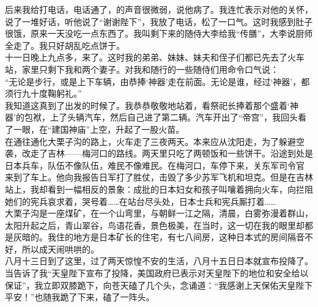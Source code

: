 后来我给打电话，电话通了，的声音很微弱，说他病了。我连忙表示对他的关怀，说了一堆好话，听他说了“谢谢陛下”，我放了电话，松了一口气。这时我感到肚子很饿，原来一天没吃一点东西了。我叫剩下来的随侍大李给我“传膳”，大李说厨师全走了。我只好胡乱吃点饼于。\\

十一日晚上九点多，来了。这时我的弟弟、妹妹、妹夫和侄子们都已先去了火车站，家里只剩下我和两个妻子。对我和随行的一些随侍们用命令口气说：\\

“无论是步行，或是上下车辆，由恭捧‘神器’走在前面。无论是谁，经过‘神器’，都须行九十度鞠躬礼。”\\

我知道这真到了出发的时候了。我恭恭敬敬地站着，看祭祀长捧着那个盛着‘神器’的包袱，上了头辆汽车，然后自己进了第二辆。汽车开出了“帝宫”，我回头看了一眼，在“建国神庙”上空，升起了一股火苗。\\

在通往通化大栗子沟的路上，火车走了三夜两天。本来应从沈阳走，为了躲避空袭，改走了吉林——梅河口的路线。两天里只吃了两顿饭和一些饼干。沿途到处是日本兵车，队伍不像队伍，难民不像难民。在梅河口，车停下来，关东军司令官 来到了车上。他向我报告日军打了胜仗，击毁了多少苏军飞机和坦克。但是在吉林站上，我却看到一幅相反的景象：成批的日本妇女和孩子叫嚷着拥向火车，向拦阻她们的宪兵哀求着，哭号着……在站台尽头处，日本士兵和宪兵厮打着……\\

大栗子沟是一座煤矿，在一个山弯里，与朝鲜一江之隔，清晨，白雾弥漫着群山，太阳升起之后，青山翠谷，鸟语花香，景色极美，在当时，这一切在我的眼里却都是灰暗的。我住的地方是日本矿长的住宅，有七八间房，这种日本式的房间隔音不好，所以成天闹哄哄的。\\

八月十三日到了这里，过了两天惊惶不安的生活，八月十五日日本就宣布投降了。\\

当告诉了我“天皇陛下宣布了投降，美国政府已表示对天皇陛下的地位和安全给以保证”，我立即双膝跪下，向苍天磕了几个头，念诵道：“我感谢上天保佑天皇陛下平安！”也随我跪了下来，磕了一阵头。\\

